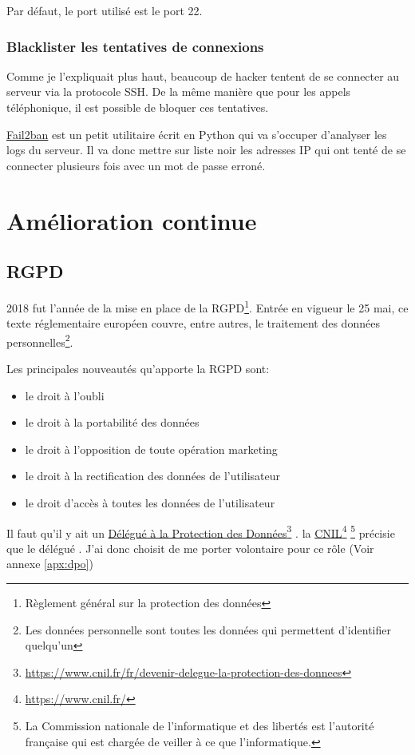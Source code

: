 \documentclass[]{report}
\newcommand\fnurl[2]{%
  \href{#1}{#2}\footnote{\url{#1}}%
}
\begin{document}
      Par défaut, le port utilisé est le port 22.


    \subsection{Blacklister les tentatives de connexions}

      Comme je l'expliquait plus haut, beaucoup de hacker tentent de se connecter au serveur via la protocole SSH. De la même manière que pour les appels téléphonique, il est possible de bloquer ces tentatives.

       \href{https://www.fail2ban.org/wiki/index.php/Main_Page}{Fail2ban} est un petit utilitaire écrit en Python qui va s’occuper d'analyser les logs du serveur. Il va donc mettre sur liste noir les adresses IP qui ont tenté de se connecter plusieurs fois avec un mot de passe erroné.

\chapter{Amélioration continue}

  \section{RGPD}

    2018 fut l'année de la mise en place de la RGPD\footnote{Règlement général sur la protection des données}. Entrée en vigueur le 25 mai, ce texte réglementaire européen couvre, entre autres, le traitement des données personnelles\footnote{Les données personnelle sont toutes les données qui permettent d'identifier quelqu'un}.

    Les principales nouveautés qu'apporte la RGPD sont:

    \begin{itemize}
      \item le droit à l'oubli
      \item le droit à la portabilité des données
      \item le droit à l'opposition de toute opération marketing
      \item le droit à la rectification des données de l'utilisateur
      \item le droit d'accès à toutes les données de l'utilisateur
    \end{itemize}

    Il faut qu'il y ait un \fnurl{https://www.cnil.fr/fr/devenir-delegue-la-protection-des-donnees}{Délégué à la Protection des Données}. la \fnurl{https://www.cnil.fr/}{CNIL}\footnote{La Commission nationale de l'informatique et des libertés est l'autorité française qui est chargée de veiller à ce que l’informatique.} précisie que le délégué . J'ai donc choisit de me porter volontaire pour ce rôle (Voir annexe \ref{apx:dpo})
\end{document}
